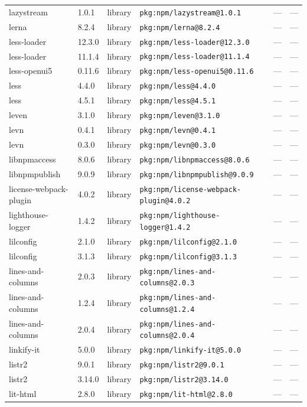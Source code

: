 \documentclass[11pt]{article}
\begin{document}
\begin{longtable}{|l|l|l|p{2.2cm}|l|p{4cm}|}
lazystream & 1.0.1 & library & \texttt{pkg:npm/lazystream@1.0.1} & — & — \\
lerna & 8.2.4 & library & \texttt{pkg:npm/lerna@8.2.4} & — & — \\
less-loader & 12.3.0 & library & \texttt{pkg:npm/less-loader@12.3.0} & — & — \\
less-loader & 11.1.4 & library & \texttt{pkg:npm/less-loader@11.1.4} & — & — \\
less-openui5 & 0.11.6 & library & \texttt{pkg:npm/less-openui5@0.11.6} & — & — \\
less & 4.4.0 & library & \texttt{pkg:npm/less@4.4.0} & — & — \\
less & 4.5.1 & library & \texttt{pkg:npm/less@4.5.1} & — & — \\
leven & 3.1.0 & library & \texttt{pkg:npm/leven@3.1.0} & — & — \\
levn & 0.4.1 & library & \texttt{pkg:npm/levn@0.4.1} & — & — \\
levn & 0.3.0 & library & \texttt{pkg:npm/levn@0.3.0} & — & — \\
libnpmaccess & 8.0.6 & library & \texttt{pkg:npm/libnpmaccess@8.0.6} & — & — \\
libnpmpublish & 9.0.9 & library & \texttt{pkg:npm/libnpmpublish@9.0.9} & — & — \\
license-webpack-plugin & 4.0.2 & library & \texttt{pkg:npm/license-webpack-plugin@4.0.2} & — & — \\
lighthouse-logger & 1.4.2 & library & \texttt{pkg:npm/lighthouse-logger@1.4.2} & — & — \\
lilconfig & 2.1.0 & library & \texttt{pkg:npm/lilconfig@2.1.0} & — & — \\
lilconfig & 3.1.3 & library & \texttt{pkg:npm/lilconfig@3.1.3} & — & — \\
lines-and-columns & 2.0.3 & library & \texttt{pkg:npm/lines-and-columns@2.0.3} & — & — \\
lines-and-columns & 1.2.4 & library & \texttt{pkg:npm/lines-and-columns@1.2.4} & — & — \\
lines-and-columns & 2.0.4 & library & \texttt{pkg:npm/lines-and-columns@2.0.4} & — & — \\
linkify-it & 5.0.0 & library & \texttt{pkg:npm/linkify-it@5.0.0} & — & — \\
listr2 & 9.0.1 & library & \texttt{pkg:npm/listr2@9.0.1} & — & — \\
listr2 & 3.14.0 & library & \texttt{pkg:npm/listr2@3.14.0} & — & — \\
lit-html & 2.8.0 & library & \texttt{pkg:npm/lit-html@2.8.0} & — & — \\

\end{longtable}
\end{document}
